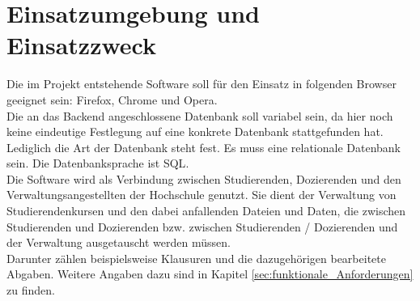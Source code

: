
\chapter{Einsatzumgebung und Einsatzzweck}
Die im Projekt entstehende Software soll für den Einsatz in folgenden Browser geeignet sein: Firefox, Chrome und Opera. \\
Die an das \gls{Backend} angeschlossene Datenbank soll variabel sein, da hier noch keine eindeutige Festlegung auf eine konkrete Datenbank stattgefunden hat. Lediglich die Art der Datenbank steht fest. Es muss eine \gls{relationale Datenbank} sein. Die Datenbanksprache ist \gls{SQL}.\\

Die Software wird als Verbindung zwischen \gls{Studierende}n, \gls{Dozierende}n und den \gls{Verwaltungsangestellte}n der Hochschule genutzt. Sie dient der Verwaltung von Studierendenkursen und den dabei anfallenden Dateien und Daten, die zwischen \gls{Studierende}n und \gls{Dozierende}n bzw. zwischen \gls{Studierende}n / \gls{Dozierende}n und der Verwaltung ausgetauscht werden müssen. \\
Darunter zählen beispielsweise Klausuren und die dazugehörigen \gls{bearbeitete} Abgaben. Weitere Angaben dazu sind in Kapitel \ref{sec:funktionale_Anforderungen} zu finden. 
